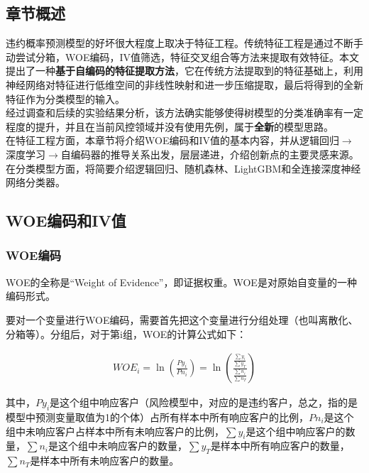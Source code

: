 \subsection{章节概述}
违约概率预测模型的好坏很大程度上取决于特征工程。传统特征工程是通过不断手动尝试分箱，WOE编码，IV值筛选，特征交叉组合等方法来提取有效特征。本文提出了一种\textbf{基于自编码的特征提取方法}，它在传统方法提取到的特征基础上，利用神经网络对特征进行低维空间的非线性映射和进一步压缩提取，最后将得到的全新特征作为分类模型的输入。\\

经过调查和后续的实验结果分析，该方法确实能够使得树模型的分类准确率有一定程度的提升，并且在当前风控领域并没有使用先例，属于\textbf{全新}的模型思路。\\

在特征工程方面，本章节将介绍WOE编码和IV值的基本内容\cite{woe_iv}，并从逻辑回归$\rightarrow$深度学习$\rightarrow$自编码器的推导关系出发，层层递进，介绍创新点的主要灵感来源。在分类模型方面，将简要介绍逻辑回归、随机森林、LightGBM和全连接深度神经网络分类器。

\subsection{WOE编码和IV值}

\subsubsection{WOE编码}
WOE\cite{woe}的全称是“Weight of Evidence”，即证据权重。WOE是对原始自变量的一种编码形式。

要对一个变量进行WOE编码，需要首先把这个变量进行分组处理（也叫离散化、分箱等）。分组后，对于第i组，WOE的计算公式如下：

\begin{equation}
    \begin{aligned}
        WOE_i = \ln(\frac{Py_i}{Pn_i})=\ln(\frac{\frac{\sum y_i}{\sum y_T}}{\frac{\sum n_i}{\sum n_T}})
    \end{aligned}
\end{equation}

其中，$Py_i$是这个组中响应客户（风险模型中，对应的是违约客户，总之，指的是模型中预测变量取值为1的个体）占所有样本中所有响应客户的比例，$Pn_i$是这个组中未响应客户占样本中所有未响应客户的比例，$\sum y_i$是这个组中响应客户的数量，$\sum n_i$是这个组中未响应客户的数量，$\sum y_T$是样本中所有响应客户的数量，$\sum n_T$是样本中所有未响应客户的数量。\\

